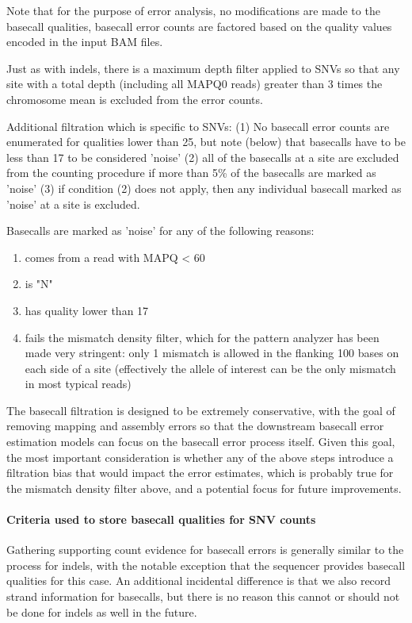 \documentclass{article}
\begin{document}
Note that for the purpose of error analysis, no modifications are made to the basecall qualities, basecall error counts are factored based on the quality values encoded in the input BAM files.

Just as with indels, there is a maximum depth filter applied to SNVs so that any site with a total depth (including all MAPQ0 reads) greater than 3 times the chromosome mean is excluded from the error counts.

Additional filtration which is specific to SNVs: (1) No basecall error counts are enumerated for qualities lower than 25, but note (below) that basecalls have to be less than 17 to be considered 'noise' (2) all of the basecalls at a site are excluded from the counting procedure if more than 5\% of the basecalls are marked as 'noise' (3) if condition (2) does not apply, then any individual basecall marked as 'noise' at a site is excluded.

Basecalls are marked as 'noise' for any of the following reasons:

\begin{enumerate}
	\item comes from a read with MAPQ < 60
	\item is "N"
	\item has quality lower than 17
	\item fails the mismatch density filter, which for the pattern analyzer has been made very stringent: only 1 mismatch is allowed in the flanking 100 bases on each side of a site (effectively the allele of interest can be the only mismatch in most typical reads)
\end{enumerate}

The basecall filtration is designed to be extremely conservative, with the goal of removing mapping and assembly errors so that the downstream basecall error estimation models can focus on the basecall error process itself. Given this goal, the most important consideration is whether any of the above steps introduce a filtration bias that would impact the error estimates, which is probably true for the mismatch density filter above, and a potential focus for future improvements.


\paragraph{Criteria used to store basecall qualities for SNV counts}

Gathering supporting count evidence for basecall errors is generally similar to the process for indels, with the notable exception that the sequencer provides basecall qualities for this case. An additional incidental difference is that we also record strand information for basecalls, but there is no reason this cannot or should not be done for indels as well in the future.
\end{document}
